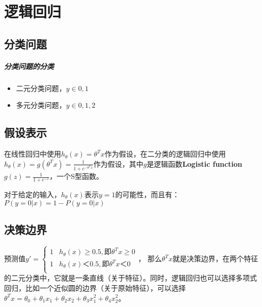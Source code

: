 \documentclass[../main.tex]{subfiles}
\begin{document}
\chapter{逻辑回归}

\section{分类问题}
\paragraph{分类问题的分类}\begin{itemize}
    \item 二元分类问题，\(y∈{0, 1}\)
    \item 多元分类问题，\(y∈{0, 1, 2}\)
\end{itemize}

\section{假设表示}
在线性回归中使用\(h_θ(x) = θ^Tx\)作为假设，在二分类的逻辑回归中使用\(h_θ(x) = g( θ^Tx) = \frac{1}{1+e^{-θ^Tx}}\)作为假设，其中\(g\)是逻辑函数\textbf{Logistic function}\(g(z) = \frac{1}{1+e^{-z}}\)，一个S型函数。
\begin{figure}[H]
    \centering
\end{figure}

对于给定的输入，\(h_θ(x)\)表示\(y=1\)的可能性，而且有：\(P(y=0|x) = 1 - P(y=0|x) \)

\section{决策边界}
预测值\(y' = \begin{cases}
    1 & h_θ(x)≥0.5, 即 θ^Tx ≥ 0   \\
    1 & h_θ(x)＜0.5, 即 θ^Tx ＜ 0 \\
\end{cases}\)，
那么\(θ^Tx\)就是决策边界，在两个特征的二元分类中，它就是一条直线（关于特征）。同时，逻辑回归也可以选择多项式回归，比如一个近似圆的边界（关于原始特征），可以选择\(θ^Tx = θ_0 + θ_1x_1 + θ_2x_2 + θ_3x_1^2 + θ_4x_2^2\)。
\end{document}
